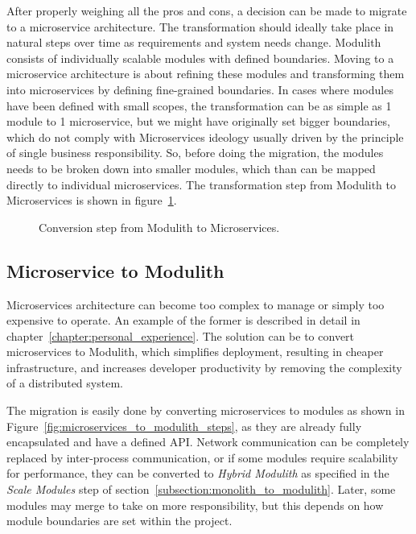 After properly weighing all the pros and cons, a decision can be made to migrate to a microservice architecture. The transformation should ideally take place in natural steps over time as requirements and system needs change. Modulith consists of individually scalable modules with defined boundaries. Moving to a microservice architecture is about refining these modules and transforming them into microservices by defining fine-grained boundaries. In cases where modules have been defined with small scopes, the transformation can be as simple as 1 module to 1 microservice, but we might have originally set bigger boundaries, which do not comply with Microservices ideology usually driven by the principle of single business responsibility. So, before doing the migration, the modules needs to be broken down into smaller modules, which than can be mapped directly to individual microservices. The transformation step from Modulith to Microservices is shown in figure~\ref{fig:modulith_to_microservices_steps}.

\begin{figure}
    \centering
    
    \caption{Conversion step from Modulith to Microservices.\label{fig:modulith_to_microservices_steps}}
\end{figure}


\subsection{Microservice to Modulith}
Microservices architecture can become too complex to manage or simply too expensive to operate. An example of the former is described in detail in chapter~\ref{chapter:personal_experience}. The solution can be to convert microservices to Modulith, which simplifies deployment, resulting in cheaper infrastructure, and increases developer productivity by removing the complexity of a distributed system.

The migration is easily done by converting microservices to modules as shown in Figure~\ref{fig:microservices_to_modulith_steps}, as they are already fully encapsulated and have a defined API. Network communication can be completely replaced by inter-process communication, or if some modules require scalability for performance, they can be converted to \textit{Hybrid Modulith} as specified in the \textit{Scale Modules} step of section~\ref{subsection:monolith_to_modulith}. Later, some modules may merge to take on more responsibility, but this depends on how module boundaries are set within the project.

